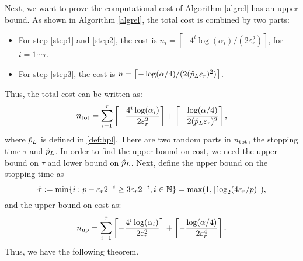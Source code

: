 \documentclass{iitthesis}
\theoremstyle{definition}
\begin{document}
Next, we want to prove the computational cost of Algorithm \ref{algrel} has an upper bound. As shown in  Algorithm \ref{algrel}, the total cost is combined by two parts:
\begin{itemize}
\item For step \ref{step1} and \ref{step2}, the cost is $n_i = \left \lceil -4^i \log\left ( \alpha_i \right)/(2\varepsilon_r^2) \right \rceil$, for $i = 1 \cdots \tau$.
\item For step \ref{step3}, the cost is $n= \left \lceil -\log (\alpha/4)/(2  (\hat{p}_L \varepsilon_{r})^2)\right \rceil $. 
\end{itemize}
Thus, the total cost can be written as: 
\begin{align}\label{totcostn}
n_{\operatorname{tot}}=\sum_{i=1}^{\tau} \left \lceil -\frac{4^i \log(\alpha_i)} {2\varepsilon_r^2 } \right\rceil+\left \lceil -\frac{\log (\alpha/4)}{2  (\hat{p}_L \varepsilon_{r})^2} \right \rceil,
\end{align}
where $\hat{p}_L$ is defined in \eqref{def:hpl}. There are two random parts in $n_{\operatorname{tot}}$, the stopping time $\tau$ and $\hat{p}_L$. In order to find the upper bound on cost, we need the upper bound on $\tau$ and lower bound on $\hat{p}_L$. Next, define the upper bound on the stopping time as
\begin{equation}\label{taubarBerRel}
\bar{\tau}: = \min \{i:  p-\varepsilon_r2^{-i} \geq 3\varepsilon_r 2^{-i}, i \in \mathbb{N} \} =\max(1,\left \lceil \log_2 (4\varepsilon_r/p)\right \rceil),
\end{equation}
and the upper bound on cost as:
\begin{align}
n_{\operatorname{up}} = \sum_{i=1}^{\bar{\tau}} \left \lceil -\frac{4^i \log(\alpha_i)} {2\varepsilon_r^2 } \right\rceil+\left \lceil -\frac{\log (\alpha/4)}{2  \varepsilon_r^4} \right \rceil.
\end{align}
Thus, we have the following theorem.
\end{document}
